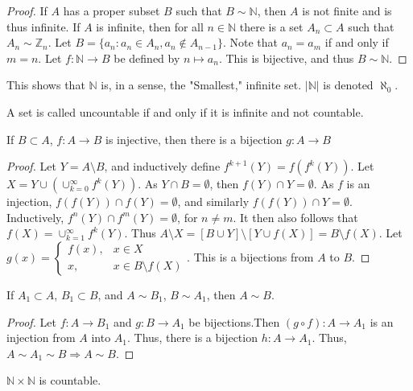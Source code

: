 \documentclass[crop=false,class=book]{standalone}
\begin{document}
\begin{proof}
If $A$ has a proper subset $B$ such that $B\sim \mathbb{N}$, then $A$ is not finite and is thus infinite. If $A$ is infinite, then for all $n\in \mathbb{N}$ there is a set $A_n\subset A$ such that $A_n \sim \mathbb{Z}_n$. Let $B = \{a_n: a_n \in A_n, a_n \notin A_{n-1}\}$. Note that $a_{n} = a_{m}$ if and only if $m= n$. Let $f:\mathbb{N} \rightarrow B$ be defined by $n\mapsto a_n$. This is bijective, and thus $B\sim \mathbb{N}$.
\end{proof}
\begin{remark}
This shows that $\mathbb{N}$ is, in a sense, the "Smallest," infinite set. $|\mathbb{N}|$ is denoted $\aleph_0$.
\end{remark}
\begin{definition}
A set is called uncountable if and only if it is infinite and not countable.
\end{definition}
\begin{lemma}
If $B\subset A$, $f:A\rightarrow B$ is injective, then there is a bijection $g:A\rightarrow B$
\end{lemma}
\begin{proof}
Let $Y = A\setminus B$, and inductively define $f^{k+1}(Y) = f(f^{k}(Y))$. Let $X = Y\cup (\cup_{k=0}^{\infty} f^{k}(Y))$. As $Y\cap B = \emptyset$, then $f(Y)\cap Y= \emptyset$. As $f$ is an injection, $f(f(Y))\cap f(Y)=\emptyset$, and similarly $f(f(Y))\cap Y = \emptyset$. Inductively, $f^{n}(Y)\cap f^{m}(Y) = \emptyset$, for $n\ne m$. It then also follows that $f(X) = \cup_{k=1}^{\infty} f^{k}(Y)$. Thus $A\setminus X = [B\cup Y]\setminus [Y\cup f(X)] = B\setminus f(X)$. Let $g(x) = \begin{cases} f(x), & x\in X \\ x, & x \in B\setminus f(X)\end{cases}$. This is a bijections from $A$ to $B$.
\end{proof}
\begin{theorem}
If $A_1 \subset A$, $B_1 \subset B$, and $A\sim B_1$, $B \sim A_1$, then $A\sim B$.
\end{theorem}
\begin{proof}
Let $f:A\rightarrow B_1$ and $g:B\rightarrow A_1$ be bijections.Then $(g\circ f):A\rightarrow A_1$ is an injection from $A$ into $A_1$. Thus, there is a bijection $h:A\rightarrow A_1$. Thus, $A\sim A_1 \sim B\Rightarrow A\sim B$.
\end{proof}
\begin{theorem}
$\mathbb{N}\times \mathbb{N}$ is countable.
\end{theorem}
\end{document}
